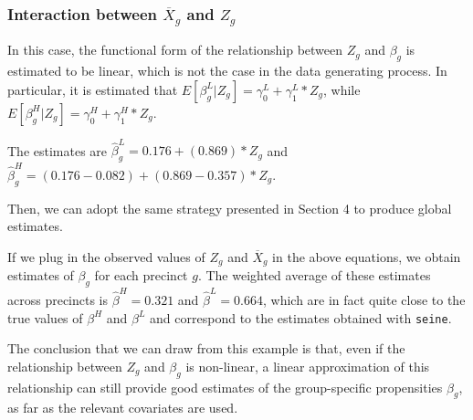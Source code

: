 \subsubsection{Interaction between $\overline{X}_g$ and $Z_g$}

In this case, the functional form of the relationship between $Z_g$ and $\beta_g$ is estimated to be linear, which is not the case in the data generating process. In particular, it is estimated that $E[\beta_g^L | Z_g] = \gamma_0^L + \gamma_1^L*Z_g$, while $E[\beta_g^H | Z_g] = \gamma_0^H + \gamma_1^H*Z_g$.



The estimates are $\hat{\beta}_{g}^{L} = 0.176 + (0.869)*Z_g$ and $\hat{\beta}_{g}^{H} = (0.176-0.082) + (0.869-0.357)*Z_g$.

Then, we can adopt the same strategy presented in Section 4 to produce global estimates.

If we plug in the observed values of $Z_g$ and $\overline{X}_g$ in the above equations, we obtain estimates of $\beta_g$ for each precinct $g$.
The weighted average of these estimates across precincts is $\hat{\beta}^{H} = 0.321$ and $\hat{\beta}^{L} = 0.664$, which are in fact quite close to the true values of $\beta^{H}$ and $\beta^{L}$ and correspond to the estimates obtained with \texttt{seine}.



The conclusion that we can draw from this example is that, even if the relationship between $Z_g$ and $\beta_g$ is non-linear, a linear approximation of this relationship can still provide good estimates of the group-specific propensities $\beta_g$, as far as the relevant covariates are used.